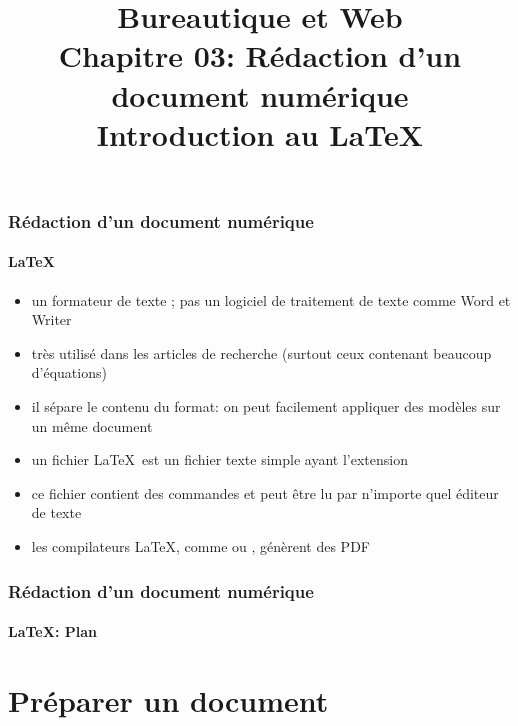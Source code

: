 \documentclass[xcolor=table]{beamer}
\title[BWEB: 03- Rédaction (\LaTeX)] %
{Bureautique et Web \\Chapitre 03: Rédaction d'un document numérique \\ Introduction au \LaTeX}
\begin{document}
\begin{frame}
\frametitle{Rédaction d'un document numérique}
\framesubtitle{\LaTeX}

\begin{itemize}
	\item un formateur de texte ; pas un logiciel de traitement de texte comme Word et Writer
	\item très utilisé dans les articles de recherche (surtout ceux contenant beaucoup d'équations)
	\item il sépare le contenu du format: on peut facilement appliquer des modèles sur un même document
	\item un fichier \LaTeX\ est un fichier texte simple ayant l'extension 
	\item ce fichier contient des commandes et peut être lu par n'importe quel éditeur de texte
	\item les compilateurs \LaTeX, comme  ou , génèrent des PDF
	
\end{itemize}

\end{frame}

\begin{frame}
\frametitle{Rédaction d'un document numérique}
\framesubtitle{\LaTeX : Plan}

\begin{multicols}{2}
\tableofcontents
\end{multicols}
\end{frame}

\section{Préparer un document}
\end{document}
